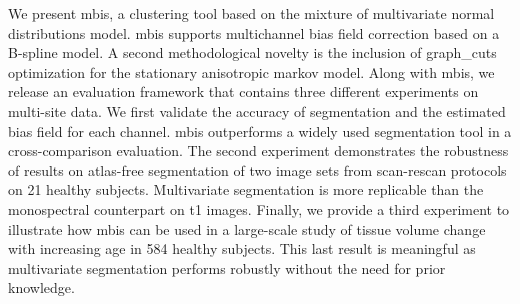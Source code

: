 We present \gls*{mbis}, a clustering tool based on
  the mixture of multivariate normal distributions model.
\Gls*{mbis} supports multichannel bias field correction
  based on a B-spline model.
A second methodological novelty is the inclusion of
  \acrlong*{graph_cuts} optimization for the stationary
  anisotropic \acrlong*{markov} model.
Along with \gls*{mbis}, we release an evaluation framework that
  contains three different experiments on multi-site data.
We first validate the accuracy of segmentation and the estimated
  bias field for each channel.
\Gls*{mbis} outperforms a widely used segmentation tool in a
  cross-comparison evaluation.
The second experiment demonstrates the robustness of results
  on atlas-free segmentation of two image sets from scan-rescan
  protocols on 21 healthy subjects.
Multivariate segmentation is more replicable than the monospectral
  counterpart on \acrlong*{t1} images.
Finally, we provide a third experiment to illustrate how \gls*{mbis}
  can be used in a large-scale study of tissue volume change with
  increasing age in 584 healthy subjects.
This last result is meaningful as multivariate segmentation performs
  robustly without the need for prior knowledge.